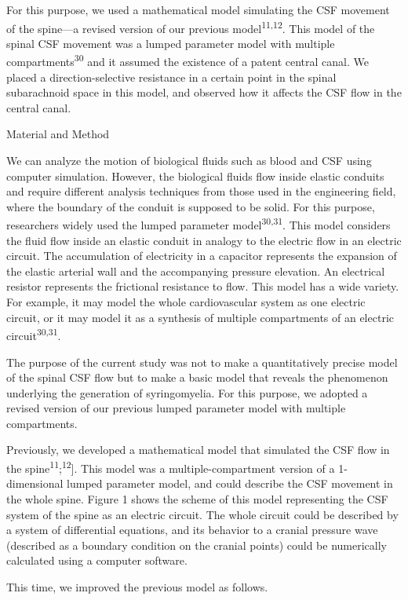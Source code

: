 \documentclass[a4paper,12pt]{article}
\begin{document}
For this purpose, we used a mathematical model simulating the CSF movement of the spine---a revised version of our previous model\textsuperscript{11,12}. This model of the spinal CSF movement was a lumped parameter model with multiple compartments\textsuperscript{30} and it assumed the existence of a patent central canal. We placed a direction-selective resistance in a certain point in the spinal subarachnoid space in this model, and observed how it affects the CSF flow in the central canal.

Material and Method

We can analyze the motion of biological fluids such as blood and CSF using computer simulation. However, the biological fluids flow inside elastic conduits and require different analysis techniques from those used in the engineering field, where the boundary of the conduit is supposed to be solid. For this purpose, researchers widely used the lumped parameter model\textsuperscript{30,31}. This model considers the fluid flow inside an elastic conduit in analogy to the electric flow in an electric circuit. The accumulation of electricity in a capacitor represents the expansion of the elastic arterial wall and the accompanying pressure elevation. An electrical resistor represents the frictional resistance to flow. This model has a wide variety. For example, it may model the whole cardiovascular system as one electric circuit, or it may model it as a synthesis of multiple compartments of an electric circuit\textsuperscript{30,31}.

The purpose of the current study was not to make a quantitatively precise model of the spinal CSF flow but to make a basic model that reveals the phenomenon underlying the generation of syringomyelia. For this purpose, we adopted a revised version of our previous lumped parameter model with multiple compartments.

Previously, we developed a mathematical model that simulated the CSF flow in the spine\textsuperscript{11};\textsuperscript{12}{]}. This model was a multiple-compartment version of a 1-dimensional lumped parameter model, and could describe the CSF movement in the whole spine. Figure 1 shows the scheme of this model representing the CSF system of the spine as an electric circuit. The whole circuit could be described by a system of differential equations, and its behavior to a cranial pressure wave (described as a boundary condition on the cranial points) could be numerically calculated using a computer software.

This time, we improved the previous model as follows.
\end{document}
